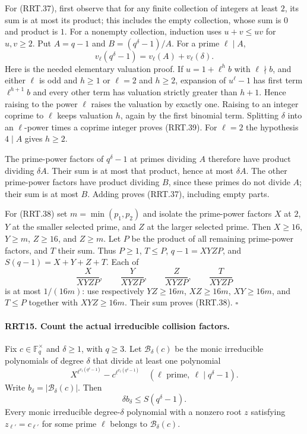 \documentclass[11pt,a4paper]{article}
\numberwithin{equation}{section}
\theoremstyle{remark}\newtheorem{remark}[theorem]{Remark}
\begin{document}
For (RRT.37), first observe that for any finite collection of
integers at least $2$, its sum is at most its product; this
includes the empty collection, whose sum is $0$ and product
is $1$.  For a nonempty collection, induction uses
$u+v\le uv$ for $u,\allowbreak{} v\ge2$.  Put $A=q-1$ and
$B=(q^\delta-1)/A$.  For a prime $\ell\mid A$,
\[
 v_\ell(q^\delta-1)=v_\ell(A)+v_\ell(\delta).
 \tag{RRT.39}
\]
Here is the needed elementary valuation proof.  If
$u=1+\ell^h b$ with $\ell\nmid b$, and either $\ell$ is odd
and $h\ge1$ or $\ell=2$ and $h\ge2$, expansion of
$u^\ell-1$ has first term $\ell^{h+1}b$ and every other
term has valuation strictly greater than $h+1$.  Hence
raising to the power $\ell$ raises the valuation by exactly
one.  Raising to an integer coprime to $\ell$ keeps valuation
$h$, again by the first binomial term.  Splitting $\delta$
into an $\ell$-power times a coprime integer proves (RRT.39).
For $\ell=2$ the hypothesis $4\mid A$ gives $h\ge2$.

The prime-power factors of $q^\delta-1$ at primes dividing
$A$ therefore have product dividing $\delta A$.  Their sum
is at most that product, hence at most $\delta A$.  The other
prime-power factors have product dividing $B$, since these
primes do not divide $A$; their sum is at most $B$.
Adding proves (RRT.37), including empty parts.

For (RRT.38) set $m=\min(p_1,\allowbreak{} p_2)$ and isolate the
prime-power factors $X$ at $2$, $Y$ at the smaller selected
prime, and $Z$ at the larger selected prime.  Then
$X\ge16$, $Y\ge m$, $Z\ge16$, and $Z\ge m$.
Let $P$ be the product of all remaining prime-power factors,
and $T$ their sum.  Thus $P\ge1$, $T\le P$,
$q-1=XYZP$, and $S(q-1)=X+Y+Z+T$.
Each of
\[
 \frac{X}{XYZP},\qquad \frac{Y}{XYZP},\qquad
 \frac{Z}{XYZP},\qquad \frac{T}{XYZP}
\]
is at most $1/(16m)$: use respectively $YZ\ge16m$,
$XZ\ge16m$, $XY\ge16m$, and $T\le P$ together with
$XYZ\ge16m$.  Their sum proves (RRT.38).
\hfill$\square$

\paragraph{RRT15. Count the actual irreducible collision factors.}
\label{claim:RRT15}
Fix $c\in\mathbb F_q^\times$ and $\delta\ge1$, with $q\ge3$.
Let $\mathcal B_\delta(c)$ be the monic irreducible polynomials
of degree $\delta$ that divide at least one polynomial
\[
 X^{\ell^{v_\ell(q^\delta-1)}}
             -c^{\ell^{v_\ell(q^\delta-1)}}
       \quad(\ell\text{ prime},\ \ell\mid q^\delta-1).
 \tag{RRT.40}
\]
Write $b_\delta=|\mathcal B_\delta(c)|$.  Then
\[
                  \delta b_\delta\le S(q^\delta-1).
 \tag{RRT.41}
\]
Every monic irreducible degree-$\delta$ polynomial with a
nonzero root $z$ satisfying $z_{\ell'}=c_{\ell'}$ for some
prime $\ell$ belongs to $\mathcal B_\delta(c)$.
\end{document}
